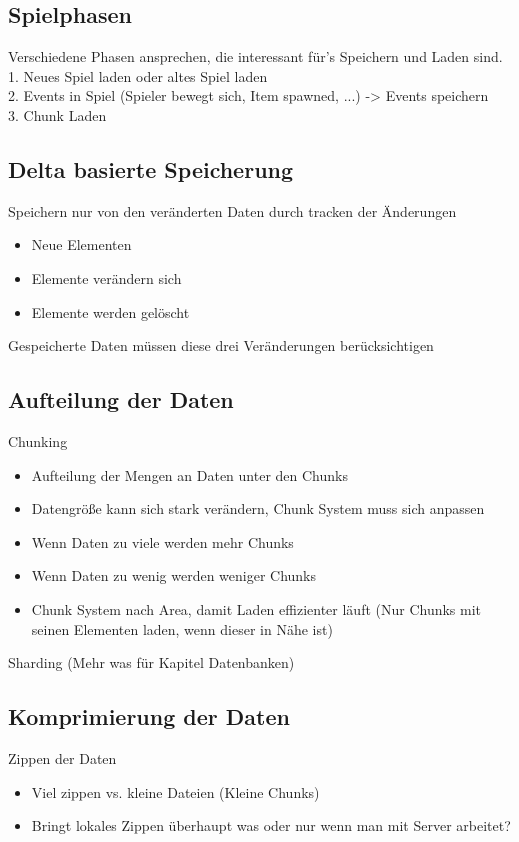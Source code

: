 \subsection{Spielphasen}
Verschiedene Phasen ansprechen, die interessant für's Speichern und Laden sind.\\
1. Neues Spiel laden oder altes Spiel laden\\
2. Events in Spiel (Spieler bewegt sich, Item spawned, ...) -> Events speichern\\
3. Chunk Laden 

\subsection{Delta basierte Speicherung}
Speichern nur von den veränderten Daten durch tracken der Änderungen
\begin{itemize}
    \item Neue Elementen
    \item Elemente verändern sich
    \item Elemente werden gelöscht
\end{itemize}
Gespeicherte Daten müssen diese drei Veränderungen berücksichtigen

\subsection{Aufteilung der Daten}
Chunking\\
\begin{itemize}
    \item Aufteilung der Mengen an Daten unter den Chunks
    \item Datengröße kann sich stark verändern, Chunk System muss sich anpassen
    \item Wenn Daten zu viele werden mehr Chunks
    \item Wenn Daten zu wenig werden weniger Chunks
    \item Chunk System nach Area, damit Laden effizienter läuft 
    (Nur Chunks mit seinen Elementen laden, wenn dieser in Nähe ist)
\end{itemize}

Sharding (Mehr was für Kapitel Datenbanken)

\subsection{Komprimierung der Daten}
Zippen der Daten\\
\begin{itemize}
    \item Viel zippen vs. kleine Dateien (Kleine Chunks)
    \item Bringt lokales Zippen überhaupt was oder nur wenn man mit Server arbeitet?
\end{itemize}

